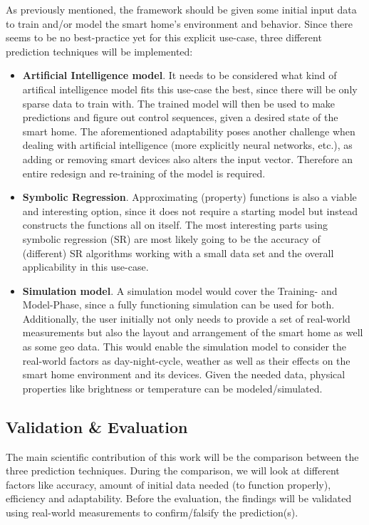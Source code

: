 \documentclass[a4paper,11pt]{article}
\begin{document}
\newpage
As previously mentioned, the framework should be given some initial input data to train and/or model the smart home's environment and behavior.
Since there seems to be no best-practice yet for this explicit use-case, three different prediction techniques will be implemented:
\begin{itemize}
    \item[] \textbf{Artificial Intelligence model}.
        It needs to be considered what kind of artifical intelligence model fits this use-case the best, since there will be only sparse data to train with.
        The trained model will then be used to make predictions and figure out control sequences, given a desired state of the smart home.
        The aforementioned adaptability poses another challenge when dealing with artificial intelligence (more explicitly neural networks, etc.), as adding or removing smart devices also alters the input vector.
        Therefore an entire redesign and re-training of the model is required.
    \item[] \textbf{Symbolic Regression}.
        Approximating (property) functions is also a viable and interesting option, since it does not require a starting model but instead constructs the functions all on itself.
        The most interesting parts using symbolic regression (SR) are most likely going to be the accuracy of (different) SR algorithms working with a small data set and the overall applicability in this use-case.
    \item[] \textbf{Simulation model}.
        A simulation model would cover the Training- and Model-Phase, since a fully functioning simulation can be used for both.
        Additionally, the user initially not only needs to provide a set of real-world measurements but also the layout and arrangement of the smart home as well as some geo data.
        This would enable the simulation model to consider the real-world factors as day-night-cycle, weather as well as their effects on the smart home environment and its devices.
        Given the needed data, physical properties like brightness or temperature can be modeled/simulated.
\end{itemize}


\subsection{Validation \& Evaluation}
The main scientific contribution of this work will be the comparison between the three prediction techniques.
During the comparison, we will look at different factors like accuracy, amount of initial data needed (to function properly), efficiency and adaptability.
Before the evaluation, the findings will be validated using real-world measurements to confirm/falsify the prediction(s).
\end{document}
